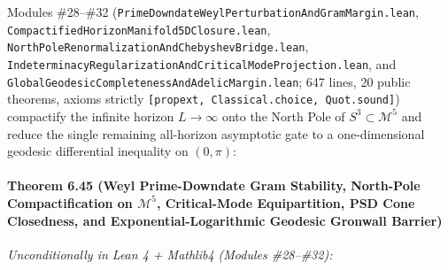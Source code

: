 \documentclass[
  11pt,
]{article}
\begin{document}
Modules \#28--\#32
(\texttt{PrimeDowndateWeylPerturbationAndGramMargin.lean},
\texttt{CompactifiedHorizonManifold5DClosure.lean},
\texttt{NorthPoleRenormalizationAndChebyshevBridge.lean},
\texttt{IndeterminacyRegularizationAndCriticalModeProjection.lean}, and
\texttt{GlobalGeodesicCompletenessAndAdelicMargin.lean}; 647 lines, 20
public theorems, axioms strictly
\texttt{{[}propext,\ Classical.choice,\ Quot.sound{]}}) compactify the
infinite horizon \(L \to \infty\) onto the North Pole of
\(S^3 \subset \mathcal{M}^5\) and reduce the single remaining
all-horizon asymptotic gate to a one-dimensional geodesic differential
inequality on \((0, \pi)\):

\paragraph{\texorpdfstring{Theorem 6.45 (Weyl Prime-Downdate Gram
Stability, North-Pole Compactification on \(\mathcal{M}^5\),
Critical-Mode Equipartition, PSD Cone Closedness, and
Exponential-Logarithmic Geodesic Gronwall
Barrier)}{Theorem 6.45 (Weyl Prime-Downdate Gram Stability, North-Pole Compactification on \textbackslash mathcal\{M\}\^{}5, Critical-Mode Equipartition, PSD Cone Closedness, and Exponential-Logarithmic Geodesic Gronwall Barrier)}}\label{theorem-6.45-weyl-prime-downdate-gram-stability-north-pole-compactification-on-mathcalm5-critical-mode-equipartition-psd-cone-closedness-and-exponential-logarithmic-geodesic-gronwall-barrier}

\emph{Unconditionally in Lean 4 + Mathlib4 (Modules \#28--\#32):}
\end{document}
